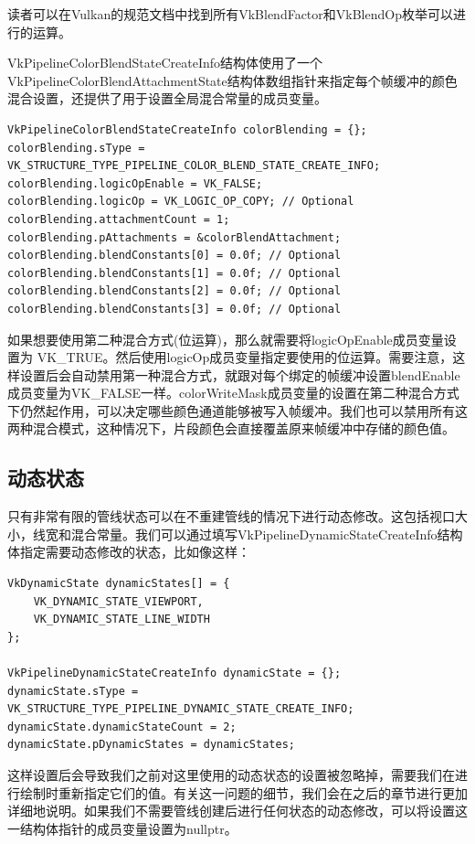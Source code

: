 \documentclass{ctexart}
\begin{document}
读者可以在Vulkan的规范文档中找到所有VkBlendFactor和VkBlendOp枚举可以进行的运算。

VkPipelineColorBlendStateCreateInfo结构体使用了一个VkPipelineColorBlendAttachmentState结构体数组指针来指定每个帧缓冲的颜色混合设置，还提供了用于设置全局混合常量的成员变量。

\begin{lstlisting}[language={[ANSI]C}]
VkPipelineColorBlendStateCreateInfo colorBlending = {};
colorBlending.sType = VK_STRUCTURE_TYPE_PIPELINE_COLOR_BLEND_STATE_CREATE_INFO;
colorBlending.logicOpEnable = VK_FALSE;
colorBlending.logicOp = VK_LOGIC_OP_COPY; // Optional
colorBlending.attachmentCount = 1;
colorBlending.pAttachments = &colorBlendAttachment;
colorBlending.blendConstants[0] = 0.0f; // Optional
colorBlending.blendConstants[1] = 0.0f; // Optional
colorBlending.blendConstants[2] = 0.0f; // Optional
colorBlending.blendConstants[3] = 0.0f; // Optional
\end{lstlisting}

如果想要使用第二种混合方式(位运算)，那么就需要将logicOpEnable成员变量设置为 VK\_TRUE。然后使用logicOp成员变量指定要使用的位运算。需要注意，这样设置后会自动禁用第一种混合方式，就跟对每个绑定的帧缓冲设置blendEnable成员变量为VK\_FALSE一样。colorWriteMask成员变量的设置在第二种混合方式下仍然起作用，可以决定哪些颜色通道能够被写入帧缓冲。我们也可以禁用所有这两种混合模式，这种情况下，片段颜色会直接覆盖原来帧缓冲中存储的颜色值。

\subsection{动态状态}

只有非常有限的管线状态可以在不重建管线的情况下进行动态修改。这包括视口大小，线宽和混合常量。我们可以通过填写VkPipelineDynamicStateCreateInfo结构体指定需要动态修改的状态，比如像这样：

\begin{lstlisting}[language={[ANSI]C}]
VkDynamicState dynamicStates[] = {
	VK_DYNAMIC_STATE_VIEWPORT,
	VK_DYNAMIC_STATE_LINE_WIDTH
};

VkPipelineDynamicStateCreateInfo dynamicState = {};
dynamicState.sType = VK_STRUCTURE_TYPE_PIPELINE_DYNAMIC_STATE_CREATE_INFO;
dynamicState.dynamicStateCount = 2;
dynamicState.pDynamicStates = dynamicStates;
\end{lstlisting}

这样设置后会导致我们之前对这里使用的动态状态的设置被忽略掉，需要我们在进行绘制时重新指定它们的值。有关这一问题的细节，我们会在之后的章节进行更加详细地说明。如果我们不需要管线创建后进行任何状态的动态修改，可以将设置这一结构体指针的成员变量设置为nullptr。
\end{document}
